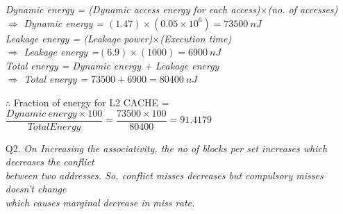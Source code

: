 \documentclass[letterpaper]{article}
\begin{document}
\begin{large}
\begin{flushleft}
\begin{enumerate}
\textit{Dynamic energy = (Dynamic access energy for each access)$\times$(no. of accesses)}\\[0.1in]
\qquad\textit{$\Rightarrow$ Dynamic energy = $(1.47)\times(0.05\times10^6) = 73500\:nJ$}\\[0.1in]
\textit{Leakage energy = (Leakage power)$\times$(Execution time)}\\[0.1in]
\qquad\textit{$\Rightarrow$ Leakage energy =$(6.9)\times(1000) = 6900\:nJ$}\\[0.1in]
\textit{Total energy = Dynamic energy + Leakage energy}\\[0.1in]
\qquad\textit{$\Rightarrow$ Total energy = $73500 + 6900 = 80400\:nJ$}\\[0.1in]
\begin{center}
$\therefore$ Fraction of energy for L2 CACHE = $\dfrac{Dynamic\ energy \times 100}{Total Energy} = \dfrac{73500 \times 100}{80400} = 91.4179$\\[0.3in]
\end{center}

\item[Q2.]
\textit{On Increasing the associativity, the no of blocks per set increases which decreases the conflict\\[0.1in] between two addresses. So, conflict misses decreases but compulsory misses doesn't change\\[0.1in] which causes marginal decrease in miss rate.}\\[0.3in]
\clearpage


\end{enumerate}
\end{flushleft}
\end{large}
\end{document}
